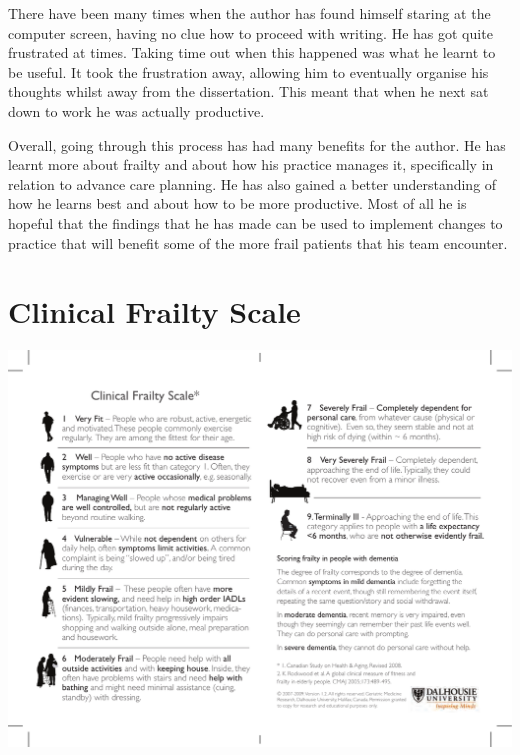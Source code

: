 \documentclass
[
	12pt,
	a4paper,
	oneside,
]{report}
\begin{document}
There have been many times when the author has found himself staring at the 
computer screen, having no clue how to proceed with writing. He has got quite
frustrated at times. Taking time out when this happened was what he learnt to
be useful. It took the frustration away, allowing him to eventually organise
his thoughts whilst away from the dissertation. This meant that when he next 
sat down to work he was actually productive.

Overall, going through this process has had many benefits for the author. He 
has learnt more about frailty and about how his practice manages it,
specifically in relation to advance care planning. He has also gained a 
better understanding of how he learns best and about how to be more productive.
Most of all he is hopeful that the 
findings that he has made can be used to implement changes to practice that 
will benefit some of the more frail patients that his team encounter.

\printbibliography[heading=bibintoc]

\clearpage

\appendix

\chapter{Clinical Frailty Scale}
\label{apx:cfs}
\includegraphics[width=\textwidth]{CFS}
\end{document}
